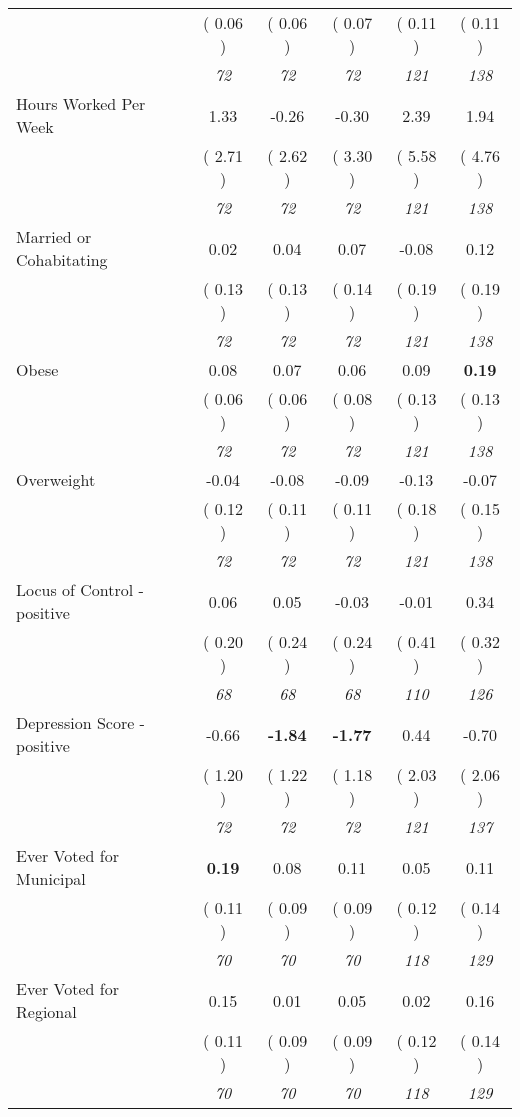 \begin{tabular}{l c c c c c}
& (     0.06 ) & (     0.06 ) & (     0.07 ) & (     0.11 ) & (     0.11 ) \\
& \textit{ 72 } & \textit{ 72 } & \textit{ 72 } & \textit{ 121 } & \textit{ 138 } \\
Hours Worked Per Week &      1.33 &     -0.26 &     -0.30 &      2.39 &      1.94 \\
& (     2.71 ) & (     2.62 ) & (     3.30 ) & (     5.58 ) & (     4.76 ) \\
& \textit{ 72 } & \textit{ 72 } & \textit{ 72 } & \textit{ 121 } & \textit{ 138 } \\
Married or Cohabitating &      0.02 &      0.04 &      0.07 &     -0.08 &      0.12 \\
& (     0.13 ) & (     0.13 ) & (     0.14 ) & (     0.19 ) & (     0.19 ) \\
& \textit{ 72 } & \textit{ 72 } & \textit{ 72 } & \textit{ 121 } & \textit{ 138 } \\
Obese &      0.08 &      0.07 &      0.06 &      0.09 & \textbf{      0.19 } \\
& (     0.06 ) & (     0.06 ) & (     0.08 ) & (     0.13 ) & (     0.13 ) \\
& \textit{ 72 } & \textit{ 72 } & \textit{ 72 } & \textit{ 121 } & \textit{ 138 } \\
Overweight &     -0.04 &     -0.08 &     -0.09 &     -0.13 &     -0.07 \\
& (     0.12 ) & (     0.11 ) & (     0.11 ) & (     0.18 ) & (     0.15 ) \\
& \textit{ 72 } & \textit{ 72 } & \textit{ 72 } & \textit{ 121 } & \textit{ 138 } \\
Locus of Control - positive &      0.06 &      0.05 &     -0.03 &     -0.01 &      0.34 \\
& (     0.20 ) & (     0.24 ) & (     0.24 ) & (     0.41 ) & (     0.32 ) \\
& \textit{ 68 } & \textit{ 68 } & \textit{ 68 } & \textit{ 110 } & \textit{ 126 } \\
Depression Score - positive &     -0.66 & \textbf{     -1.84 } & \textbf{     -1.77 } &      0.44 &     -0.70 \\
& (     1.20 ) & (     1.22 ) & (     1.18 ) & (     2.03 ) & (     2.06 ) \\
& \textit{ 72 } & \textit{ 72 } & \textit{ 72 } & \textit{ 121 } & \textit{ 137 } \\
Ever Voted for Municipal & \textbf{      0.19 } &      0.08 &      0.11 &      0.05 &      0.11 \\
& (     0.11 ) & (     0.09 ) & (     0.09 ) & (     0.12 ) & (     0.14 ) \\
& \textit{ 70 } & \textit{ 70 } & \textit{ 70 } & \textit{ 118 } & \textit{ 129 } \\
Ever Voted for Regional &      0.15 &      0.01 &      0.05 &      0.02 &      0.16 \\
& (     0.11 ) & (     0.09 ) & (     0.09 ) & (     0.12 ) & (     0.14 ) \\
& \textit{ 70 } & \textit{ 70 } & \textit{ 70 } & \textit{ 118 } & \textit{ 129 } \\
\bottomrule
\end{tabular}
